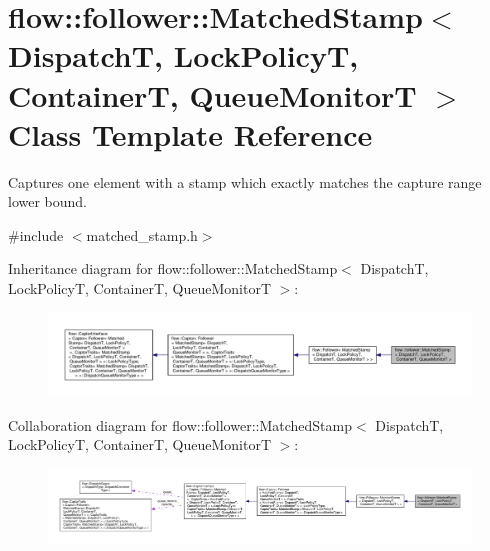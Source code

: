 \hypertarget{classflow_1_1follower_1_1_matched_stamp}{}\section{flow\+:\+:follower\+:\+:Matched\+Stamp$<$ DispatchT, Lock\+PolicyT, ContainerT, Queue\+MonitorT $>$ Class Template Reference}
\label{classflow_1_1follower_1_1_matched_stamp}


Captures one element with a stamp which exactly matches the capture range lower bound.  




{\ttfamily \#include $<$matched\+\_\+stamp.\+h$>$}



Inheritance diagram for flow\+:\+:follower\+:\+:Matched\+Stamp$<$ DispatchT, Lock\+PolicyT, ContainerT, Queue\+MonitorT $>$\+:
\nopagebreak
\begin{figure}[H]
\begin{center}
\leavevmode
\includegraphics[width=350pt]{classflow_1_1follower_1_1_matched_stamp__inherit__graph}
\end{center}
\end{figure}


Collaboration diagram for flow\+:\+:follower\+:\+:Matched\+Stamp$<$ DispatchT, Lock\+PolicyT, ContainerT, Queue\+MonitorT $>$\+:
\nopagebreak
\begin{figure}[H]
\begin{center}
\leavevmode
\includegraphics[width=350pt]{classflow_1_1follower_1_1_matched_stamp__coll__graph}
\end{center}
\end{figure}
